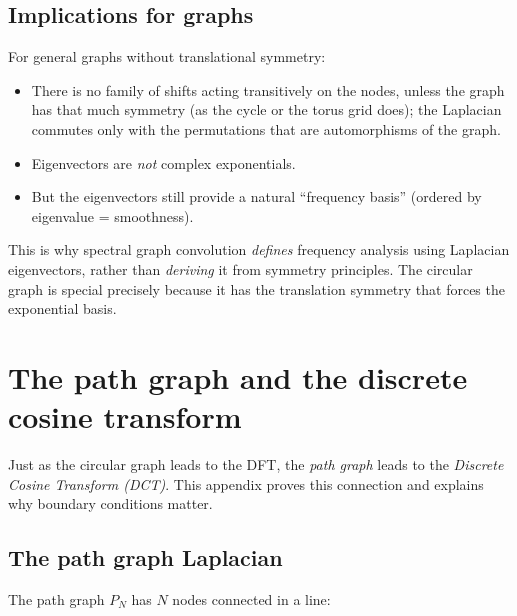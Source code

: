 \begin{notechapter}
\subsection{Implications for graphs}

For general graphs without translational symmetry:
\begin{itemize}
\item There is no family of shifts acting transitively on the nodes, unless the graph has that much symmetry (as the cycle or the torus grid does); the Laplacian commutes only with the permutations that are automorphisms of the graph.
\item Eigenvectors are \emph{not} complex exponentials.
\item But the eigenvectors still provide a natural ``frequency basis''
      (ordered by eigenvalue = smoothness).
\end{itemize}

This is why spectral graph convolution \emph{defines} frequency analysis
using Laplacian eigenvectors, rather than \emph{deriving} it from
symmetry principles. The circular graph is special precisely because
it has the translation symmetry that forces the exponential basis.

\section{The path graph and the discrete cosine transform}
\label{dft-to-gnn:app:dct-path}

Just as the circular graph leads to the DFT, the \emph{path graph}
leads to the \emph{Discrete Cosine Transform (DCT)}. This appendix
proves this connection and explains why boundary conditions matter.

\subsection{The path graph Laplacian}

The path graph $P_N$ has $N$ nodes connected in a line:
\begin{center}
\end{center}
\end{notechapter}
